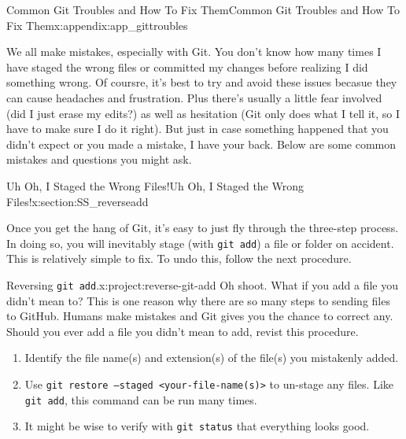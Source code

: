 \documentclass[oneside,10pt,]{book}
\newcommand{\mono}[1]{\texttt{#1}}
\begin{document}
\begin{appendixptx}{Common Git Troubles and How To Fix Them}{}{Common Git Troubles and How To Fix Them}{}{}{x:appendix:app_gittroubles}
%
\begin{introduction}{}%
We all make mistakes, especially with Git. You don't know how many times I have staged the wrong files or committed my changes before realizing I did something wrong. Of coursre, it's best to try and avoid these issues becasue they can cause headaches and frustration. Plus there's usually a little fear involved (did I just erase my edits?) as well as hesitation (Git only does what I tell it, so I have to make sure I do it right). But just in case something happened that you didn't expect or you made a mistake, I have your back. Below are some common mistakes and questions you might ask.%
\end{introduction}%
%
%
\typeout{************************************************}
\typeout{************************************************}
%
\begin{sectionptx}{Uh Oh, I Staged the Wrong Files!}{}{Uh Oh, I Staged the Wrong Files!}{}{}{x:section:SS_reverseadd}
%
%
\begin{introduction}{}%
Once you get the hang of Git, it's easy to just fly through the three-step process. In doing so, you will inevitably stage (with \mono{git add}) a file or folder on accident. This is relatively simple to fix. To undo this, follow the next procedure.%
\end{introduction}%
\begin{project}{Reversing \mono{git add}.}{x:project:reverse-git-add}%
Oh shoot. What if you add a file you didn't mean to? This is one reason why there are so many steps to sending files to GitHub. Humans make mistakes and Git gives you the chance to correct any. Should you ever add a file you didn't mean to add, revist this procedure.%
\begin{enumerate}[font=\bfseries,label=(\alph*),ref=\alph*]
\item{}Identify the file name(s) and extension(s) of the file(s) you mistakenly added.%
\item{}Use \mono{git restore --staged <your-file-name(s)>} to un-stage any files. Like \mono{git add}, this command can be run many times.%
\item{}It might be wise to verify with \mono{git status} that everything looks good.%
\end{enumerate}

\end{project}
\end{sectionptx}
\end{appendixptx}
\end{document}
